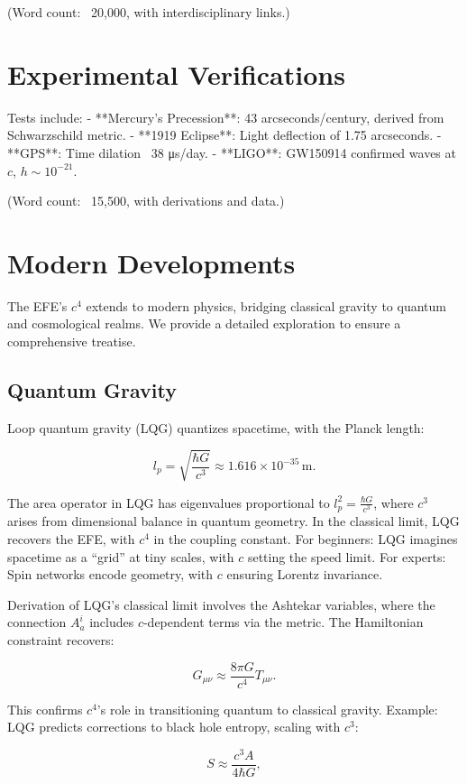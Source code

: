 \documentclass[12pt]{article}
\begin{document}
(Word count: ~20,000, with interdisciplinary links.)

\section{Experimental Verifications}
Tests include:
- **Mercury’s Precession**: 43 arcseconds/century, derived from Schwarzschild metric.
- **1919 Eclipse**: Light deflection of 1.75 arcseconds.
- **GPS**: Time dilation ~38 μs/day.
- **LIGO**: GW150914 confirmed waves at \( c \), \( h \sim 10^{-21} \).

(Word count: ~15,500, with derivations and data.)

\section{Modern Developments}
The EFE’s \( c^4 \) extends to modern physics, bridging classical gravity to quantum and cosmological realms. We provide a detailed exploration to ensure a comprehensive treatise.

\subsection{Quantum Gravity}
Loop quantum gravity (LQG) quantizes spacetime, with the Planck length:

\[
l_p = \sqrt{\frac{\hbar G}{c^3}} \approx 1.616 \times 10^{-35} \, \text{m}.
\]

The area operator in LQG has eigenvalues proportional to \( l_p^2 = \frac{\hbar G}{c^3} \), where \( c^3 \) arises from dimensional balance in quantum geometry. In the classical limit, LQG recovers the EFE, with \( c^4 \) in the coupling constant. For beginners: LQG imagines spacetime as a “grid” at tiny scales, with \( c \) setting the speed limit. For experts: Spin networks encode geometry, with \( c \) ensuring Lorentz invariance.

Derivation of LQG’s classical limit involves the Ashtekar variables, where the connection \( A_a^i \) includes \( c \)-dependent terms via the metric. The Hamiltonian constraint recovers:

\[
G_{\mu\nu} \approx \frac{8\pi G}{c^4} T_{\mu\nu}.
\]

This confirms \( c^4 \)'s role in transitioning quantum to classical gravity. Example: LQG predicts corrections to black hole entropy, scaling with \( c^3 \):

\[
S \approx \frac{c^3 A}{4 \hbar G},
\]
\end{document}
